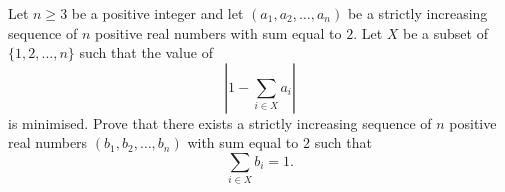 Let $n \geq 3$ be a positive integer and let $(a_1, a_2, \ldots, a_n)$ be a strictly increasing sequence of $n$ positive real numbers with sum equal to $2$. Let $X$ be a subset of $\{1, 2, \ldots, n\}$ such that the value of
\[ \left| 1 - \sum_{i \in X} a_i \right| \]
is minimised. Prove that there exists a strictly increasing sequence of $n$ positive real numbers $(b_1, b_2, \ldots, b_n)$ with sum equal to $2$ such that
\[ \sum_{i \in X} b_i = 1. \]
